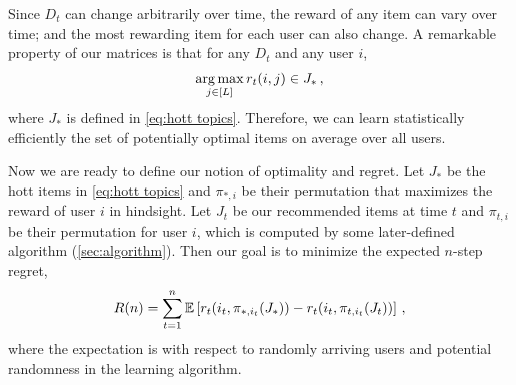 Since $D_t$ can change arbitrarily over time, the reward of any item can vary over time; and the most rewarding item for each user can also change. A remarkable property of our matrices is that for any $D_t$ and any user $i$,
\begin{align*}
  \mathop{\rm arg\,max}_{j \in [L]} r_t(i, j) \in J_\ast\,,
\end{align*}
where $J_\ast$ is defined in \eqref{eq:hott topics}. Therefore, we can learn statistically efficiently the set of potentially optimal items on average over all users.

Now we are ready to define our notion of optimality and regret. Let $J_\ast$ be the hott items in \eqref{eq:hott topics} and $\pi_{\ast, i}$ be their permutation that maximizes the reward of user $i$ in hindsight. Let $J_t$ be our recommended items at time $t$ and $\pi_{t, i}$ be their permutation for user $i$, which is computed by some later-defined algorithm (\cref{sec:algorithm}). Then our goal is to minimize the expected $n$-step regret,
\begin{align*}
  R(n) =
  \sum_{t = 1}^n \mathbb{E}\left[r_t(i_t, \pi_{\ast, i_t}(J_\ast)) - r_t(i_t, \pi_{t, i_t}(J_t))\right]\,,
\end{align*}
where the expectation is with respect to randomly arriving users and potential randomness in the learning algorithm.
